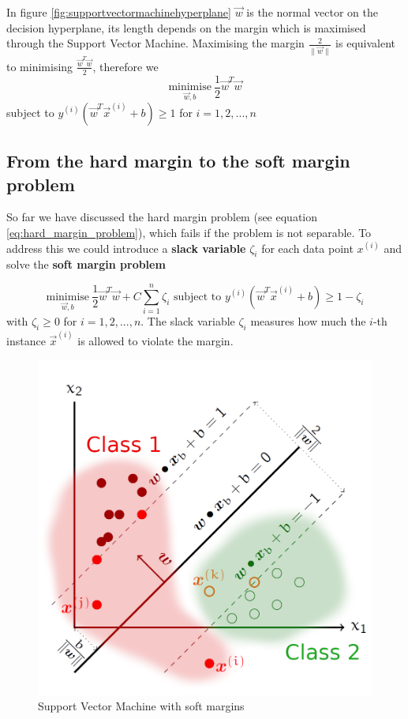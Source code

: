 \documentclass[11pt]{article}
\begin{document}
In figure \ref{fig:supportvectormachinehyperplane} $\vec{w}$ is the normal vector on the decision hyperplane, its length depends on the margin which is
maximised through the Support Vector Machine. Maximising the margin $\frac{2}{\| \vec{w} \|}$ is equivalent to minimising $\frac{\vec{w}^T \vec{w}}{2}$, therefore we
\begin{equation}\label{eq:hard_margin_problem}
    \underset{\vec{w}, b}{\text{minimise}}\ \frac{1}{2}\vec{w}^T \vec{w}
\end{equation}
\noindent
subject to $y^{(i)}(\vec{w}^T \vec{x}^{(i)}+b)\geq 1$ for $i = 1,2,...,n$


\subsection{From the hard margin to the soft margin problem}

So far we have discussed the hard margin problem (see equation \ref{eq:hard_margin_problem}), which fails if the problem is not separable. To address this we could introduce a \textbf{slack variable} $\zeta_i$ for each data point $x^{(i)}$ and solve the \textbf{soft margin problem}

\begin{equation}\label{eq:soft_margin_problem}
    \underset{\vec{w}, b}{\text{minimise}}\ \frac{1}{2}\vec{w}^T \vec{w} + C\sum_{i=1}^{n}\zeta_i \text{ subject to } y^{(i)}(\vec{w}^T \vec{x}^{(i)} + b) \geq 1 - \zeta_i
\end{equation}
\noindent
with $\zeta_i \geq 0$ for $i=1,2,...,n$. The slack variable $\zeta_i$ measures how much the $i$-th instance $\vec{x}^{(i)}$ is allowed to violate the margin.

\begin{figure}
    \centering
    \includegraphics[keepaspectratio,width=0.4\linewidth]{Pictures/soft_margin_svm}
    \caption{Support Vector Machine with soft margins}
    \label{fig:svm_softmargins}
\end{figure}
\end{document}
